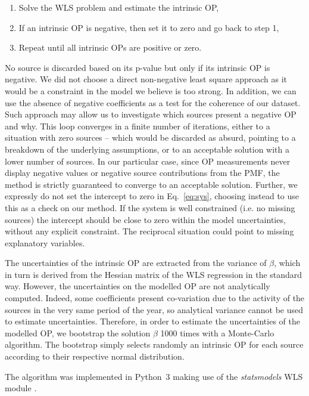 \documentclass[acp, manuscript]{copernicus}
\begin{document}
\begin{enumerate}
    \item
        Solve the WLS problem and estimate the intrinsic OP,
    \item
        If an intrinsic OP is negative, then set it to zero and go back to step
        1,
    \item
        Repeat until all intrinsic OPs are positive or zero.
\end{enumerate}

No source is discarded based on its p-value but only if its intrinsic OP
is negative. We did not choose a direct non-negative least square
approach as it would be a constraint in the model we believe is too strong. In addition,
we can use the absence of negative coefficients as a test for the
coherence of our dataset. Such approach may allow us to
investigate which sources present a negative OP and why. This loop
converges in a finite number of iterations, either to a situation with
zero sources -- which would be discarded as absurd, pointing to a
breakdown of the underlying assumptions, or to an acceptable solution
with a lower number of sources. In our particular case, since OP
measurements never display negative values or negative source
contributions from the PMF, the method is strictly guaranteed to
converge to an acceptable solution. Further, we expressly do not set the
intercept to zero in Eq.~\ref{eq:sys}, choosing instead to use this as a
check on our method. If the system is well constrained (i.e. no
missing sources) the intercept should be close to zero within the model
uncertainties, without any explicit constraint. The reciprocal situation
could point to missing explanatory variables.

The uncertainties of the intrinsic OP are extracted from the variance of
$\beta$, which in turn is derived from the Hessian matrix of the WLS
regression in the standard way. However, the uncertainties on the
modelled OP are not analytically computed. Indeed, some coefficients
present co-variation due to the activity of the sources in the very same
period of the year, so analytical variance cannot be used to estimate
uncertainties. Therefore, in order to estimate the uncertainties of the
modelled OP, we bootstrap the solution $\beta$ 1000 times with a Monte-Carlo
algorithm. The bootstrap simply selects randomly an intrinsic OP for
each source according to their respective normal distribution.

The algorithm was implemented in Python~3 making use of the
\emph{statsmodels} WLS module \citep{seabold_statsmodels:_2010}.
\end{document}

